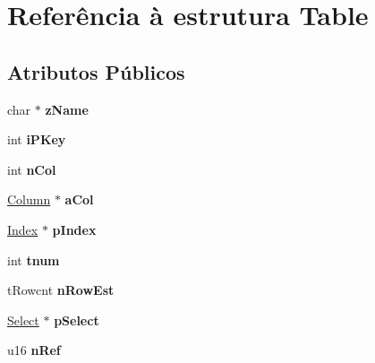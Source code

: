 \hypertarget{struct_table}{\section{Referência à estrutura Table}
\label{struct_table}
}
\subsection*{Atributos Públicos}
\begin{DoxyCompactItemize}
\item 
\hypertarget{struct_table_a20ca62607d6da596b1016b76cf677809}{char $\ast$ {\bfseries z\-Name}}\label{struct_table_a20ca62607d6da596b1016b76cf677809}

\item 
\hypertarget{struct_table_ab6c8b60da43ccc8a2e2b5b65cc74058f}{int {\bfseries i\-P\-Key}}\label{struct_table_ab6c8b60da43ccc8a2e2b5b65cc74058f}

\item 
\hypertarget{struct_table_a2b3925b85368f0367322ab66bf289163}{int {\bfseries n\-Col}}\label{struct_table_a2b3925b85368f0367322ab66bf289163}

\item 
\hypertarget{struct_table_a87ec3b706ecf9545bd9ed582a12ce3e7}{\hyperlink{struct_column}{Column} $\ast$ {\bfseries a\-Col}}\label{struct_table_a87ec3b706ecf9545bd9ed582a12ce3e7}

\item 
\hypertarget{struct_table_a5dffd0c9e8f0265d6a47b32bd0e6d59f}{\hyperlink{struct_index}{Index} $\ast$ {\bfseries p\-Index}}\label{struct_table_a5dffd0c9e8f0265d6a47b32bd0e6d59f}

\item 
\hypertarget{struct_table_aebe1abbfb2fd4b5e5dff8e74a4f3c890}{int {\bfseries tnum}}\label{struct_table_aebe1abbfb2fd4b5e5dff8e74a4f3c890}

\item 
\hypertarget{struct_table_a909f316fb8c4f86771ae1b5e55c23230}{t\-Rowcnt {\bfseries n\-Row\-Est}}\label{struct_table_a909f316fb8c4f86771ae1b5e55c23230}

\item 
\hypertarget{struct_table_a39d620182fe2174fc97d04094421fa60}{\hyperlink{struct_select}{Select} $\ast$ {\bfseries p\-Select}}\label{struct_table_a39d620182fe2174fc97d04094421fa60}

\item 
\hypertarget{struct_table_a5c3d59f52186917d412d42e008dd302c}{u16 {\bfseries n\-Ref}}\label{struct_table_a5c3d59f52186917d412d42e008dd302c}


\end{DoxyCompactItemize}
